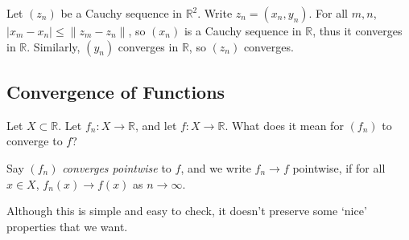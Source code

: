 \documentclass[12pt]{article}
\begin{document}
\begin{proofbox}
	Let $(z_n)$ be a Cauchy sequence in $\mathbb{R}^2$. Write $z_n = (x_n, y_n)$. For all $m, n$, $|x_m - x_n| \leq \|z_m - z_n\|$, so $(x_n)$ is a Cauchy sequence in $\mathbb{R}$, thus it converges in $\mathbb{R}$. Similarly, $(y_n)$ converges in $\mathbb{R}$, so $(z_n)$ converges.
\end{proofbox}

\subsection{Convergence of Functions}%
\label{sub:convergence_of_functions}

Let $X \subset \mathbb{R}$. Let $f_n : X \to \mathbb{R}$, and let $f : X \to \mathbb{R}$. What does it mean for $(f_n)$ to converge to $f$?

\begin{definition}
	Say $(f_n)$ \textit{converges pointwise} to $f$, and we write $f_n \to f$ pointwise, if for all $x \in X$, $f_n(x) \to f(x)$ as $n \to \infty$.
\end{definition}

Although this is simple and easy to check, it doesn't preserve some `nice' properties that we want.
\end{document}
